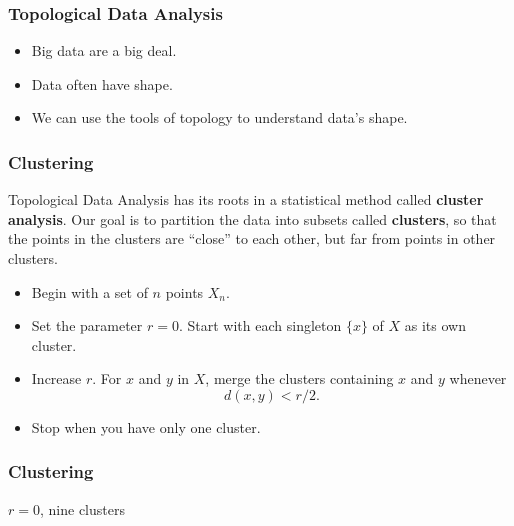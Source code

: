 \begin{frame}
\frametitle{Topological Data Analysis}
\begin{itemize}
	\item<1-> Big data are a big deal.
	\item<2-> Data often have shape.
	\item<3-> We can use the tools of topology to understand data's shape.
\end{itemize}
\end{frame}

\begin{frame}
\frametitle{Clustering}
Topological Data Analysis has its roots in a statistical method called \textbf{cluster analysis}. Our goal is to partition the data into subsets called \textbf{clusters}, so that the points in the clusters are ``close'' to each other, but far from points in other clusters. 
\begin{itemize}
	\item<1-> Begin with a set of $n$ points $X_n$.
	\item<2-> Set the parameter $r=0$. Start with each singleton $\{x\}$ of $X$ as its own cluster.
	\item<3-> Increase $r$. For $x$ and $y$ in $X$, merge the clusters containing $x$ and $y$ whenever
	\[
	d(x,y) <r/2.
	\]
	\item<5-> Stop when you have only one cluster.
\end{itemize}
\end{frame}
\begin{frame}
\frametitle{Clustering}
\begin{center}
\end{center}
$r=0$, \quad nine clusters
\end{frame}
